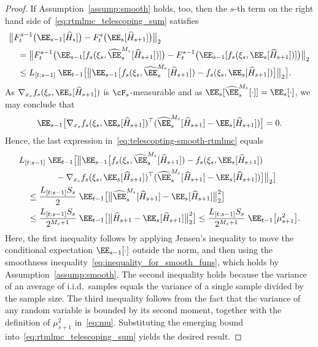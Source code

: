 \documentclass[11pt]{article}
\let\hat\widehat
\begin{document}
\begin{proof}
If Assumption~\ref{assump:smooth} holds, too,  then the $s$-th term on the right hand side of~\eqref{eq:rtmlmc_telescoping_sum} satisfies
\begin{equation}
\label{eq:telescopting-smooth-rtmlmc}
\begin{aligned}
    & \big\| F_t^{s-1}\big(\EE_{s-1}[\hat{H}_s]\big) - F_t^s\big(\EE_s[\hat{H}_{s+1}]\big)\big\|_2 \\
    & \quad =  \big\| F_t^{s-1}\big(\EE_{s-1}[f_s(\xi_s,\hat\EE_s^{M_s}[\hat{H}_{s+1}])]\big) - F_t^{s-1}\big(\EE_{s-1}[f_s(\xi_s,\EE_s[\hat{H}_{s+1}])]\big)\big\|_2\\
    & \quad \leq L_{[t:s-1]}\; \EE_{t-1}\big[\big\|\EE_{s-1}\big[f_s(\xi_s,\hat\EE_s^{M_s}[\hat{H}_{s+1}]) - f_s(\xi_s,\EE_s[\hat{H}_{s+1}])\big] \big\|_2\big].
\end{aligned}
\end{equation}
As $ \nabla_{x_s} f_s(\xi_s, \EE_{s} [\hat{H}_{s+1}])$ is $\cF_s$-measurable and as $\EE_{s}[\hat\EE_s^{M_s}[\cdot]] = \EE_{s}[\cdot]$, we may conclude that
\begin{align*}
    \EE_{s-1}\big[\nabla_{x_s}f_s(\xi_s,\EE_{s}[\hat{H}_{s+1}])^\top (\hat\EE_s^{M_s}[\hat{H}_{s+1}] - \EE_{s}[\hat{H}_{s+1}])\big] =0.
\end{align*}
Hence, the last expression in~\eqref{eq:telescopting-smooth-rtmlmc} equals
\begin{align*}
    & L_{[t:s-1]}\;\EE_{t-1}\big[\big\|\EE_{s-1}\big[f_s(\xi_s, \hat\EE_s^{M_s}[\hat{H}_{s+1}]) - f_s(\xi_s,\EE_s[\hat{H}_{s+1}]) \\
    &\qquad\;\qquad - \nabla_{x_s}f_s(\xi_s,\EE_s[\hat{H}_{s+1}])^\top (\hat\EE_s^{M_s}[\hat{H}_{s+1}] - \EE_s[\hat{H}_{s+1}]) \big]\big\|_2\big]\\
    & \quad \leq \frac{L_{[t:s-1]}S_s}{2}\;\EE_{t-1}\big[ \big\|\hat\EE_s^{M_s}[\hat{H}_{s+1}] - \EE_s[\hat{H}_{s+1}] \big\|_2^2 \big]\\
    & \quad \leq \frac{L_{[t:s-1]}S_s}{2^{M_s+1}}\; \EE_{t-1}\big[ \big\|\hat{H}_{s+1} - \EE_s[\hat{H}_{s+1}] \big\|_2^2 \big]\leq \frac{L_{[t:s-1]}S_s}{2^{M_s+1}}\; \EE_{t-1}\big[\mu_{s+1}^{2}\big].
\end{align*}
Here, the first inequality follows by applying Jensen's inequality to move the conditional expectation $\EE_{s-1}[\cdot]$ outside the norm, and then using the smoothness inequality~\eqref{eq:inequality_for_smooth_funs}, which holds by Assumption~\ref{assump:smooth}. The second inequality holds because the variance of an average of i.i.d.\ samples equals the variance of a single sample divided by the sample size. The third inequality follows from the fact that the variance of any random variable is bounded by its second moment, together with the definition of $\mu_{s+1}^{2}$ in~\eqref{eq:mu}. Substituting the emerging bound into~\eqref{eq:rtmlmc_telescoping_sum} yields the desired result.
\end{proof}
\end{document}

